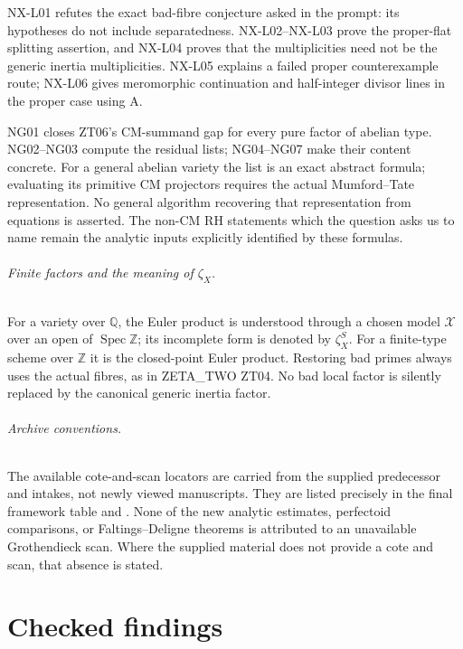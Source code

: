 \documentclass[11pt]{article}
\theoremstyle{remark}
\begin{document}
NX-L01 refutes the exact bad-fibre conjecture asked in the prompt:
its hypotheses do not include separatedness.  NX-L02--NX-L03 prove
the proper-flat splitting assertion, and NX-L04 proves that the
multiplicities need not be the generic inertia multiplicities.
NX-L05 explains a failed proper counterexample route; NX-L06 gives
meromorphic continuation and half-integer divisor lines in the
proper case using A.

NG01 closes ZT06's CM-summand gap for every pure factor of abelian
type.  NG02--NG03 compute the residual lists; NG04--NG07 make their
content concrete.  For a general abelian variety the list is an
exact abstract formula; evaluating its primitive CM projectors
requires the actual Mumford--Tate representation.  No general
algorithm recovering that representation from equations is asserted.
The non-CM RH statements which the question asks us to name remain
the analytic inputs explicitly identified by these formulas.

\paragraph{Finite factors and the meaning of $\zeta_X$.}
For a variety over $\mathbb Q$, the Euler product is understood
through a chosen model $\mathcal X$ over an open of
$\operatorname{Spec}\mathbb Z$; its incomplete form is denoted by
$\zeta_X^S$.  For a finite-type scheme over $\mathbb Z$ it is the
closed-point Euler product.  Restoring bad primes always uses the
actual fibres, as in ZETA\_TWO ZT04.  No bad local factor is silently
replaced by the canonical generic inertia factor.

\paragraph{Archive conventions.}
The available cote-and-scan locators are carried from the supplied
predecessor and intakes, not newly viewed manuscripts.  They are
listed precisely in the final framework table and
.  None of the new analytic estimates,
perfectoid comparisons, or Faltings--Deligne theorems is attributed
to an unavailable Grothendieck scan.  Where the supplied material
does not provide a cote and scan, that absence is stated.

\part{Checked findings}
\end{document}
